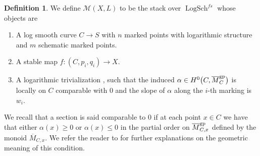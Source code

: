 \documentclass[11pt]{article}
\numberwithin{equation}{section}
\newcommand{\M}{\mathcal{M}}
\renewcommand{\leq}{\leqslant}
\renewcommand{\geq}{\geqslant}
\numberwithin{equation}{section}
\theoremstyle{definition}
\newtheorem{defi}[theo]{Definition}
\begin{document}
\begin{defi}\label{def:logstablemaps}
 We define $\M(X,L)$ to be the stack over $\operatorname{LogSch}^{fs}$ whose objects are
 \begin{enumerate}\itemsep=0pt
 \item [(1)] A log smooth curve $C\to S$ with $n$ marked points with logarithmic structure and $m$ schematic marked points.
 \item [(2)] A stable map $f\colon (C,p_i,q_i)\to X$.
 \item [(3)] A logarithmic trivialization , such that the induced $\alpha\in H^0\bigl(C,\allowbreak\overline{M}_C^{\rm gp}\bigr)$ is locally on $C$ comparable with $0$ and the slope of $\alpha$ along the $i$-th marking is $w_i$.
 \end{enumerate}

We recall that a section  is said comparable to $0$ if at each point $x\in C$ we have that either $\alpha(x)\geq 0$ or $\alpha(x)\leq 0$ in the partial order on $\overline{M}^{\rm gp}_{C,x}$ defined by the monoid $\overline{M}_{C,x}$. We refer the reader to \cite[Section~2.5]{RSPW2} for further explanations on the geometric meaning of this condition.
\end{defi}
\end{document}

